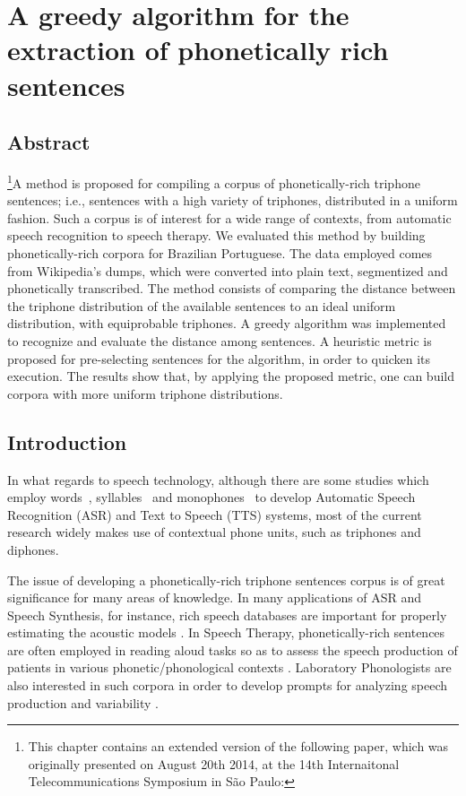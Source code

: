\chapter{A greedy algorithm for the extraction of phonetically rich sentences}\label{ch:phonetically-rich}

\section*{Abstract}

\footnote{This chapter contains an extended version of the following paper, which was originally presented on August 20th 2014, at the 14th Internaitonal Telecommunications Symposium in S\~ao Paulo: }A method is proposed for compiling a corpus of phonetically-rich triphone sentences; 
i.e., sentences with a high variety of triphones, distributed in a uniform fashion. 
Such a corpus is of interest for a wide range of contexts, from automatic speech 
recognition to speech therapy. We evaluated this method by building phonetically-rich corpora for Brazilian Portuguese. The data employed comes 
from Wikipedia's dumps, which were converted into plain text, segmentized and 
phonetically transcribed. The method consists of comparing the distance between 
the triphone distribution of the available sentences to an ideal uniform distribution, with 
equiprobable triphones. A greedy algorithm was implemented to recognize and evaluate 
the distance among sentences. A heuristic metric is proposed for pre-selecting 
sentences for the algorithm, in order to quicken its execution. The results show 
that, by applying the proposed metric, one can build corpora with more uniform 
triphone distributions.


\section{Introduction}

In what regards to speech technology, although there are some studies which employ words~\cite{Thanga2008}, syllables~\cite{Gana2001} and monophones~\cite{Kumar2014} to develop Automatic Speech Recognition (ASR) and Text to Speech (TTS) systems, most of the current research widely makes use of contextual phone units, such as triphones and diphones.

The issue of developing a phonetically-rich triphone sentences corpus is of great significance for many areas 
of knowledge. In many applications of  ASR and Speech Synthesis, for instance, rich speech databases are important for properly estimating the acoustic models \cite{Rabiner2007}. In Speech Therapy, phonetically-rich sentences are often employed in reading aloud tasks so as to assess the speech production of patients in various phonetic/phonological contexts \cite{Mendes2012}. Laboratory Phonologists
are also interested in such corpora in order to develop prompts for analyzing speech production and variability \cite{Pierrehumbert2000}.

